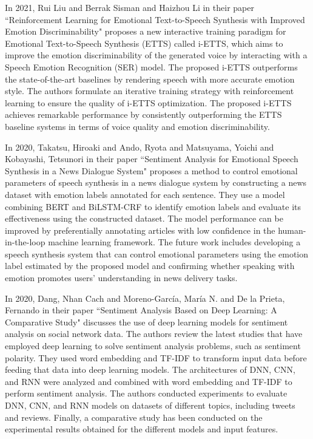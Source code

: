 In 2021, Rui Liu and Berrak Sisman and Haizhou Li in their paper ``Reinforcement Learning for Emotional Text-to-Speech Synthesis with Improved Emotion Discriminability" proposes a new interactive training paradigm for Emotional Text-to-Speech Synthesis (ETTS) called i-ETTS, which aims to improve the emotion discriminability of the generated voice by interacting with a Speech Emotion Recognition (SER) model. The proposed i-ETTS outperforms the state-of-the-art baselines by rendering speech with more accurate emotion style. The authors formulate an iterative training strategy with reinforcement learning to ensure the quality of i-ETTS optimization. The proposed i-ETTS achieves remarkable performance by consistently outperforming the ETTS baseline systems in terms of voice quality and emotion discriminability\cite{liu21p_interspeech}.
\vspace{1\baselineskip}

In 2020, Takatsu, Hiroaki  and Ando, Ryota and Matsuyama, Yoichi  and Kobayashi, Tetsunori in their paper ``Sentiment Analysis for Emotional Speech Synthesis in a News Dialogue System" proposes a method to control emotional parameters of speech synthesis in a news dialogue system by constructing a news dataset with emotion labels annotated for each sentence. They use a model combining BERT and BiLSTM-CRF to identify emotion labels and evaluate its effectiveness using the constructed dataset. The model performance can be improved by preferentially annotating articles with low confidence in the human-in-the-loop machine learning framework. The future work includes developing a speech synthesis system that can control emotional parameters using the emotion label estimated by the proposed model and confirming whether speaking with emotion promotes users' understanding in news delivery tasks\cite{takatsu-etal-2020-sentiment}.
\vspace{1\baselineskip}

In 2020, Dang, Nhan Cach and Moreno-García, María N. and De la Prieta, Fernando in their paper ``Sentiment Analysis Based on Deep Learning: A Comparative Study" discusses the use of deep learning models for sentiment analysis on social network data. The authors review the latest studies that have employed deep learning to solve sentiment analysis problems, such as sentiment polarity. They used word embedding and TF-IDF to transform input data before feeding that data into deep learning models. The architectures of DNN, CNN, and RNN were analyzed and combined with word embedding and TF-IDF to perform sentiment analysis. The authors conducted experiments to evaluate DNN, CNN, and RNN models on datasets of different topics, including tweets and reviews. Finally, a comparative study has been conducted on the experimental results obtained for the different models and input features\cite{electronics9030483}.
\vspace{1\baselineskip}

